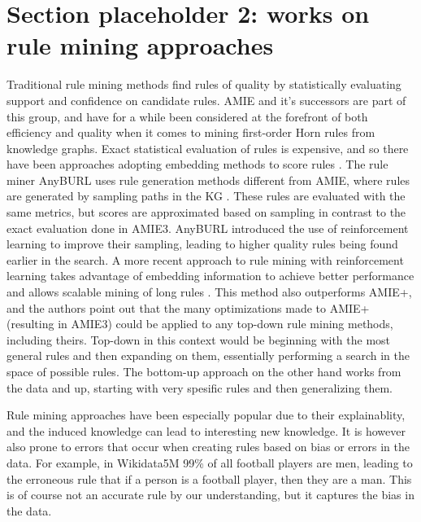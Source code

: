 \section{Section placeholder 2: works on rule mining approaches}
Traditional rule mining methods find rules of quality by statistically evaluating support and confidence on candidate rules. AMIE and it's successors are part of this group, and have for a while been considered at the forefront of both efficiency and quality when it comes to mining first-order Horn rules from knowledge graphs. Exact statistical evaluation of rules is expensive, and so there have been approaches adopting embedding methods to score rules \cite{yang2014embedding, omran2018scalable, omran2019embedding}. The rule miner AnyBURL uses rule generation methods different from AMIE, where rules are generated by sampling paths in the KG \cite{meilicke2020reinforced}. These rules are evaluated with the same metrics, but scores are approximated based on sampling in contrast to the exact evaluation done in AMIE3. AnyBURL introduced the use of reinforcement learning to improve their sampling, leading to higher quality rules being found earlier in the search. A more recent approach to rule mining with reinforcement learning takes advantage of embedding information to achieve better performance and allows scalable mining of long rules \cite{chen2022rule}. This method also outperforms AMIE+, and the authors point out that the many optimizations made to AMIE+ (resulting in AMIE3) could be applied to any top-down rule mining methods, including theirs. Top-down in this context would be beginning with the most general rules and then expanding on them, essentially performing a search in the space of possible rules. The bottom-up approach on the other hand works from the data and up, starting with very spesific rules and then generalizing them.

Rule mining approaches have been especially popular due to their explainablity, and the induced knowledge can lead to interesting new knowledge. It is however also prone to errors that occur when creating rules based on bias or errors in the data. For example, in Wikidata5M 99\% of all football players are men, leading to the erroneous rule that if a person is a football player, then they are a man. This is of course not an accurate rule by our understanding, but it captures the bias in the data.



